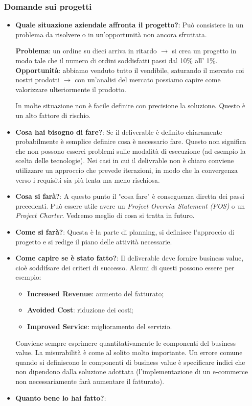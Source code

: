 \subsubsection{Domande sui progetti}
\begin{itemize}
	\item \textbf{Quale situazione aziendale affronta il progetto?}: Può consistere in un problema da risolvere o in un'opportunità non ancora sfruttata.
	\begin{info}[Esempio]
		\textbf{Problema}: un ordine su dieci arriva in ritardo $\xrightarrow{}$ si crea un progetto in modo tale che il numero di ordini soddisfatti passi dal 10\% all' 1\%.\newline
		\textbf{Opportunità}: abbiamo venduto tutto il vendibile, saturando il mercato coi nostri prodotti $\xrightarrow{}$ con un'analisi del mercato possiamo capire come valorizzare ulteriormente il prodotto.
	\end{info}
	In molte situazione non è facile definire con precisione la soluzione. Questo è un alto fattore di rischio.
	\item \textbf{Cosa hai bisogno di fare?}: Se il deliverable è definito chiaramente probabilmente è semplice definire cosa è necessario fare. Questo non significa che non possono esserci problemi sulle modalità di esecuzione (ad esempio la scelta delle tecnologie). Nei casi in cui il delivrable non è chiaro conviene utilizzare un approccio che prevede iterazioni, in modo che la convergenza verso i requisiti sia più lenta ma meno rischiosa.
	\item \textbf{Cosa si farà?}: A questo punto il "cosa fare" è conseguenza diretta dei passi precedenti. Può essere utile avere un \textit{Project Overviw Statement (POS)} o un \textit{Project Charter}. Vedremo meglio di cosa si tratta in futuro.
	\item \textbf{Come si farà?}: Questa è la parte di planning, si definisce l'approccio di progetto e si redige il piano delle attività necessarie.
	\item \textbf{Come capire se è stato fatto?}: Il deliverable deve fornire business value, cioè soddifsare dei criteri di successo. Alcuni di questi possono essere per esempio:
	\begin{itemize}
		\item \textbf{Increased Revenue}: aumento del fatturato;
		\item \textbf{Avoided Cost}: riduzione dei costi;
		\item \textbf{Improved Service}: miglioramento del servizio.
	\end{itemize}
	Conviene sempre esprimere quantitativamente le componenti del business value. La misurabilità è come al solito molto importante. Un errore comune quando si definiscono le componenti di business value è specificare indici che non dipendono dalla soluzione adottata (l'implementazione di un e-commerce non necessariamente farà aumentare il fatturato).
	\item \textbf{Quanto bene lo hai fatto?}:
\end{itemize}
